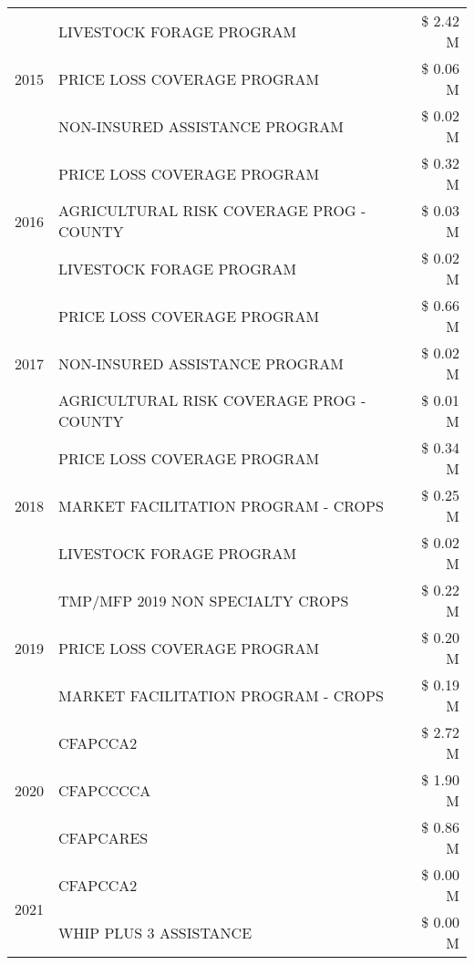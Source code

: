\begin{tabular}{llr}
\multirow[t]{3}{*}{2015} & LIVESTOCK FORAGE PROGRAM & \$ 2.42 M \\
 & PRICE LOSS COVERAGE PROGRAM & \$ 0.06 M \\
 & NON-INSURED ASSISTANCE PROGRAM & \$ 0.02 M \\
\cline{1-3}
\multirow[t]{3}{*}{2016} & PRICE LOSS COVERAGE PROGRAM & \$ 0.32 M \\
 & AGRICULTURAL RISK COVERAGE PROG - COUNTY & \$ 0.03 M \\
 & LIVESTOCK FORAGE PROGRAM & \$ 0.02 M \\
\cline{1-3}
\multirow[t]{3}{*}{2017} & PRICE LOSS COVERAGE PROGRAM & \$ 0.66 M \\
 & NON-INSURED ASSISTANCE PROGRAM & \$ 0.02 M \\
 & AGRICULTURAL RISK COVERAGE PROG - COUNTY & \$ 0.01 M \\
\cline{1-3}
\multirow[t]{3}{*}{2018} & PRICE LOSS COVERAGE PROGRAM & \$ 0.34 M \\
 & MARKET FACILITATION PROGRAM - CROPS & \$ 0.25 M \\
 & LIVESTOCK FORAGE PROGRAM & \$ 0.02 M \\
\cline{1-3}
\multirow[t]{3}{*}{2019} & TMP/MFP 2019 NON SPECIALTY CROPS & \$ 0.22 M \\
 & PRICE LOSS COVERAGE PROGRAM & \$ 0.20 M \\
 & MARKET FACILITATION PROGRAM - CROPS & \$ 0.19 M \\
\cline{1-3}
\multirow[t]{3}{*}{2020} & CFAPCCA2 & \$ 2.72 M \\
 & CFAPCCCCA & \$ 1.90 M \\
 & CFAPCARES & \$ 0.86 M \\
\cline{1-3}
\multirow[t]{2}{*}{2021} & CFAPCCA2 & \$ 0.00 M \\
 & WHIP PLUS 3 ASSISTANCE & \$ 0.00 M \\
\cline{1-3}
\bottomrule
\end{tabular}
